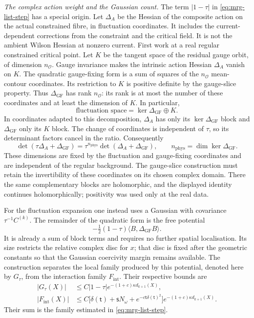 \documentclass[11pt,letterpaper,reqno]{amsart}
\theoremstyle{definition}
\theoremstyle{remark}
\begin{document}
\emph{The complex action weight and the Gaussian count.}
The term $|1-\tau|$ in \eqref{eq:mrg-list-step} has a special
origin. Let $\Delta_A$ be the Hessian of the composite action on the
actual constrained fibre, in fluctuation coordinates. It includes the
current-dependent corrections from the constraint and the critical
field. It is not the ambient Wilson Hessian at nonzero current.
First work at a real regular constrained critical point. Let $K$ be the tangent space
of the residual gauge orbit, of dimension $n_{\mathcal O}$.
Gauge invariance makes the intrinsic action Hessian $\Delta_A$
vanish on $K$. The quadratic gauge-fixing form is a sum of squares
of the $n_{\mathcal O}$ mean-contour coordinates. Its restriction
to $K$ is positive definite by the gauge-slice property. Thus
$\Delta_{\mathrm{GF}}$ has rank $n_{\mathcal O}$: its rank is at
most the number of these coordinates and at least the dimension
of $K$. In particular,
\[
 \text{fluctuation space}=\ker\Delta_{\mathrm{GF}}\oplus K.
\]
In coordinates adapted to this decomposition, $\Delta_A$ has
only its $\ker\Delta_{\mathrm{GF}}$ block and
$\Delta_{\mathrm{GF}}$ only its $K$ block.
The change of coordinates is independent of $\tau$, so its
determinant factors cancel in the ratio. Consequently
\[
 \det(\tau\Delta_A+\Delta_{\mathrm{GF}})
   =\tau^{n_{\mathrm{phys}}}
                    \det(\Delta_A+\Delta_{\mathrm{GF}}),
 \qquad n_{\mathrm{phys}}=\dim\ker\Delta_{\mathrm{GF}}.
\]
These dimensions are fixed by the fluctuation and gauge-fixing
coordinates and are independent of the regular background.
The gauge-slice construction must retain the invertibility of these
coordinates on its chosen complex domain. There the same complementary
blocks are holomorphic, and the displayed identity continues
holomorphically; positivity was used only at the real data.

For the fluctuation expansion one instead uses a Gaussian with
covariance $\tau^{-1}C^{(k)}$. The remainder of the quadratic form
is the free potential
\[
 -\tfrac12(1-\tau)\langle B,\Delta_{\mathrm{GF}}B\rangle.
\]
It is already a sum of block terms and requires no further spatial
localisation. Its size restricts the relative complex disc for $x$;
that disc is fixed after the geometric constants so that the
Gaussian coercivity margin remains available. The construction
separates the local family produced by this potential, denoted here
by $G_\tau$, from the interaction family $F_{\mathrm{int}}$. Their
respective bounds are
\[
 \begin{split}
 |G_\tau(X)|&\le C|1-\tau|e^{-(1+c)\kappa d_{k+1}(X)},\\
 |F_{\mathrm{int}}(X)|&\le
 C\big[\delta(\mathsf t)+\mathsf sN_\omega
             +e^{-c\mathsf t\delta(\mathsf t)^2}\big]
                         e^{-(1+c)\kappa d_{k+1}(X)}.
 \end{split}
\]
Their sum is the family estimated in \eqref{eq:mrg-list-step}.
\end{document}
